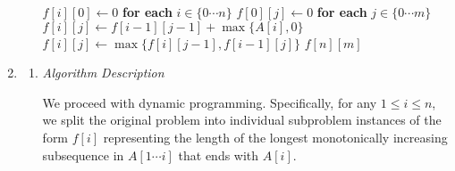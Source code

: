 \documentclass{article}
\begin{document}
\begin{enumerate}[leftmargin={*}, font={\bf}, label={\arabic*.}, ref={\arabic*}]
\begin{enumerate}
        \begin{minipage}{\linewidth}
          \begin{algorithm}[H]
            \caption{$\textsc{Max-Sum-Common-Subsequence}(A, B)$}\label{alg:max-sum-commmon-subsequence}
            \begin{algorithmic}[1]
              \State $f[i][0] \gets 0$ \textbf{for each} $i \in \{0 \cdots n\}$
              \State $f[0][j] \gets 0$ \textbf{for each} $j \in \{0 \cdots m\}$
                    \State $f[i][j] \gets f[i-1][j-1] + \max\big\{A[i], 0\big\}$
                  \Else
                  \State $f[i][j] \gets \max\big\{f[i][j-1], f[i-1][j]\big\}$
                  \EndIf
                \EndFor
              \EndFor
              \State \Return $f[n][m]$
            \end{algorithmic}
          \end{algorithm}
        \end{minipage}
    \end{enumerate}

  \newpage

  \item \label{qst:4}
    \begin{enumerate}
      \item \label{qst:4a}
        {\itshape Algorithm Description}

        We proceed with dynamic programming. Specifically, for any $1 \leq i \leq n$, we split the
        original problem into individual subproblem instances of the form $f[i]$ representing the
        length of the longest monotonically increasing subsequence in $A[1 \cdots i]$ that ends with
        $A[i]$.


\end{enumerate}
\end{enumerate}
\end{document}
